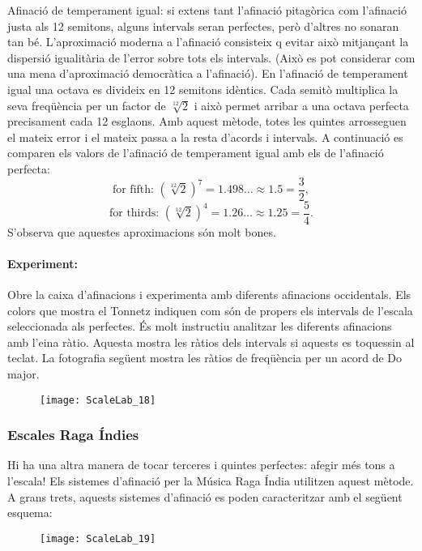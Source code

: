 Afinació de temperament igual: si extens tant l'afinació pitagòrica com l'afinació justa als 12 semitons, alguns intervals seran perfectes, però d'altres no sonaran tan bé. L'aproximació moderna a l'afinació consisteix q evitar això mitjançant la dispersió igualitària de l'error sobre tots els intervals. (Això es pot considerar com una mena d'aproximació democràtica a l'afinació). En l'afinació de temperament igual una octava es divideix en 12 semitons idèntics. Cada semitò multiplica la seva freqüència per un factor de $\sqrt[12]{2}$ i això permet arribar a una octava perfecta precisament cada 12 esglaons. Amb aquest mètode, totes les quintes arrosseguen el mateix error i el mateix passa a la resta d'acords i intervals. A continuació es comparen els valors de l'afinació de temperament igual amb els de l'afinació perfecta:
$$\textrm{for fifth: } (\sqrt[12]{2})^7 = 1.498\ldots \approx 1.5 = \frac{3}{2} ,$$
$$\textrm{for thirds: } (\sqrt[12]{2})^4 = 1.26\ldots \approx 1.25 = \frac{5}{4} .$$
S'observa que aquestes aproximacions són molt bones.

\paragraph{Experiment:}
Obre la caixa d'afinacions i experimenta amb diferents afinacions occidentals. Els colors que mostra el Tonnetz indiquen com són de propers els intervals de l'escala seleccionada als perfectes. És molt instructiu analitzar les diferents afinacions amb l'eina ràtio. Aquesta mostra les ràtios dels intervals si aquests es toquessin al teclat. La fotografia següent mostra les ràtios de freqüència per un acord de Do major. 

\begin{figure}[h]
\centering
\texttt{[image: ScaleLab\_18]}
\end{figure}

\subsubsection{Escales Raga Índies}
Hi ha una altra manera de tocar terceres i quintes perfectes: afegir més tons a l'escala! Els sistemes d'afinació per la Música Raga Índia utilitzen aquest mètode. A grans trets, aquests sistemes d'afinació es poden caracteritzar amb el següent esquema:

\begin{figure}[h]
\centering
\texttt{[image: ScaleLab\_19]}
\end{figure}

